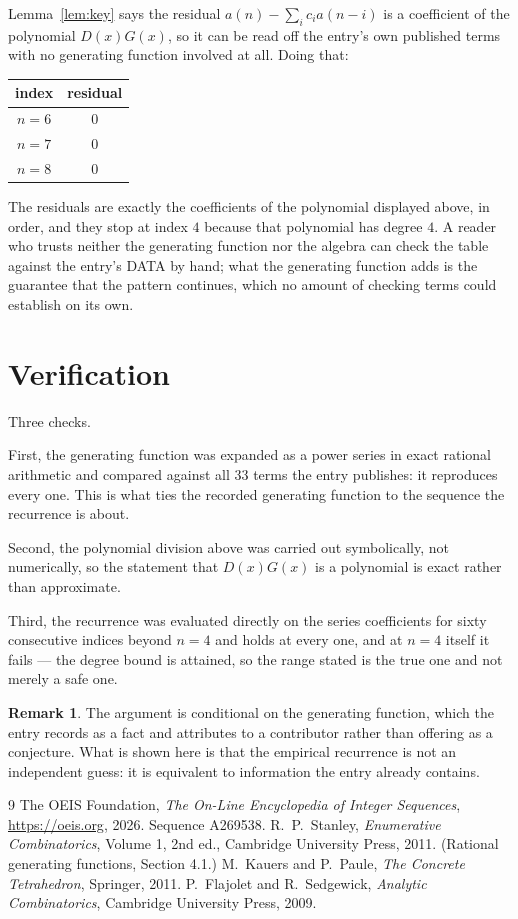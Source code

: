 \documentclass[11pt,a4paper]{article}
\theoremstyle{plain}
\theoremstyle{definition}
\newtheorem{remark}[theorem]{Remark}
\begin{document}
Lemma~\ref{lem:key} says the residual $a(n)-\sum_ic_ia(n-i)$ is a coefficient of the
polynomial $D(x)G(x)$, so it can be read off the entry's own published terms with no
generating function involved at all. Doing that:
\begin{center}
\begin{tabular}{cc}
index & residual \\ \hline
$n=6$ & $0$ \\
$n=7$ & $0$ \\
$n=8$ & $0$
\end{tabular}
\end{center}
The residuals are exactly the coefficients of the polynomial displayed above, in order, and
they stop at index $4$ because that polynomial has degree $4$. A reader who trusts
neither the generating function nor the algebra can check the table against the entry's DATA
by hand; what the generating function adds is the guarantee that the pattern continues, which
no amount of checking terms could establish on its own.

\section{Verification}

Three checks.

First, the generating function was expanded as a power series in exact rational arithmetic and
compared against all $33$ terms the entry publishes: it reproduces every one. This is
what ties the recorded generating function to the sequence the recurrence is about.

Second, the polynomial division above was carried out symbolically, not numerically, so the
statement that $D(x)G(x)$ is a polynomial is exact rather than approximate.

Third, the recurrence was evaluated directly on the series coefficients for sixty consecutive
indices beyond $n=4$ and holds at every one, and at $n=4$ itself it fails --- the
degree bound is attained, so the range stated is the true one and not merely a safe one.

\begin{remark}
The argument is conditional on the generating function, which the entry records as a fact and
attributes to a contributor rather than offering as a conjecture. What is shown here is that
the empirical recurrence is not an independent guess: it is equivalent to information the
entry already contains.
\end{remark}

\begin{thebibliography}{9}
 The OEIS Foundation, \emph{The On-Line Encyclopedia of Integer
Sequences}, \url{https://oeis.org}, 2026. Sequence A269538.
 R.~P.~Stanley, \emph{Enumerative Combinatorics}, Volume 1, 2nd ed.,
Cambridge University Press, 2011. (Rational generating functions, Section 4.1.)
 M.~Kauers and P.~Paule, \emph{The Concrete Tetrahedron}, Springer, 2011.
 P.~Flajolet and R.~Sedgewick, \emph{Analytic Combinatorics}, Cambridge
University Press, 2009.
\end{thebibliography}
\end{document}
